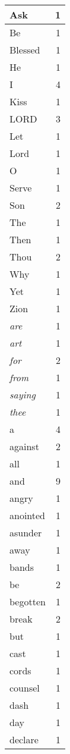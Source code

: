 \begin{center}
\begin{longtable}{l|r}
\hline \hline
\endlastfoot
Ask & 1 \\ \hline
Be & 1 \\ \hline
Blessed & 1 \\ \hline
He & 1 \\ \hline
I & 4 \\ \hline
Kiss & 1 \\ \hline
LORD & 3 \\ \hline
Let & 1 \\ \hline
Lord & 1 \\ \hline
O & 1 \\ \hline
Serve & 1 \\ \hline
Son & 2 \\ \hline
The & 1 \\ \hline
Then & 1 \\ \hline
Thou & 2 \\ \hline
Why & 1 \\ \hline
Yet & 1 \\ \hline
Zion & 1 \\ \hline
\emph{are} & 1 \\ \hline
\emph{art} & 1 \\ \hline
\emph{for} & 2 \\ \hline
\emph{from} & 1 \\ \hline
\emph{saying} & 1 \\ \hline
\emph{thee} & 1 \\ \hline
a & 4 \\ \hline
against & 2 \\ \hline
all & 1 \\ \hline
and & 9 \\ \hline
angry & 1 \\ \hline
anointed & 1 \\ \hline
asunder & 1 \\ \hline
away & 1 \\ \hline
bands & 1 \\ \hline
be & 2 \\ \hline
begotten & 1 \\ \hline
break & 2 \\ \hline
but & 1 \\ \hline
cast & 1 \\ \hline
cords & 1 \\ \hline
counsel & 1 \\ \hline
dash & 1 \\ \hline
day & 1 \\ \hline
declare & 1 \\ \hline

\end{longtable}
\end{center}
